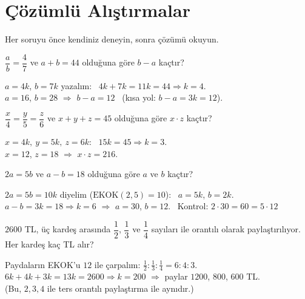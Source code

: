 \section{Çözümlü Alıştırmalar}
Her soruyu önce kendiniz deneyin, sonra çözümü okuyun.

\begin{alistirma}
\(\dfrac{a}{b}=\dfrac{4}{7}\) ve \(a+b=44\) olduğuna göre \(b-a\) kaçtır?
\end{alistirma}
\begin{cozum}
\(a=4k\), \(b=7k\) yazalım: \ \(4k+7k=11k=44\Rightarrow k=4\).\\
\(a=16\), \(b=28\) \(\Rightarrow\) \(b-a=12\) \ (kısa yol: \(b-a=3k=12\)).
\end{cozum}

\begin{alistirma}
\(\dfrac{x}{4}=\dfrac{y}{5}=\dfrac{z}{6}\) ve \(x+y+z=45\) olduğuna göre \(x\cdot z\) kaçtır?
\end{alistirma}
\begin{cozum}
\(x=4k,\ y=5k,\ z=6k\): \ \(15k=45\Rightarrow k=3\).\\
\(x=12\), \(z=18\) \(\Rightarrow\) \(x\cdot z=216\).
\end{cozum}

\begin{alistirma}
\(2a=5b\) ve \(a-b=18\) olduğuna göre \(a\) ve \(b\) kaçtır?
\end{alistirma}
\begin{cozum}
\(2a=5b=10k\) diyelim (\(\mathrm{EKOK}(2,5)=10\)): \ \(a=5k\), \(b=2k\).\\
\(a-b=3k=18\Rightarrow k=6\) \(\Rightarrow\) \(a=30\), \(b=12\). \ Kontrol: \(2\cdot 30=60=5\cdot 12\) \checkmark
\end{cozum}

\begin{alistirma}
\(2600\) TL, üç kardeş arasında \(\dfrac{1}{2}\), \(\dfrac{1}{3}\) ve \(\dfrac{1}{4}\) sayıları ile orantılı olarak paylaştırılıyor. Her kardeş kaç TL alır?
\end{alistirma}
\begin{cozum}
Paydaların EKOK'u \(12\) ile çarpalım: \(\tfrac12:\tfrac13:\tfrac14=6:4:3\).\\
\(6k+4k+3k=13k=2600\Rightarrow k=200\) \(\Rightarrow\) paylar \(1200\), \(800\), \(600\) TL.\\
(Bu, \(2,3,4\) ile ters orantılı paylaştırma ile aynıdır.)
\end{cozum}

